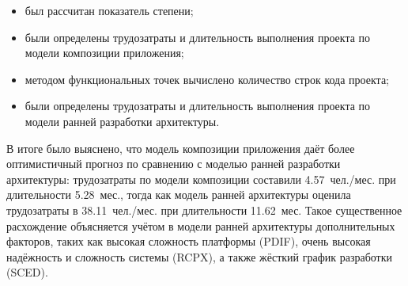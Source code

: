 \begin{itemize}
    \item был рассчитан показатель степени;
    \item были определены трудозатраты и длительность выполнения проекта по модели композиции приложения;
    \item методом функциональных точек вычислено количество строк кода проекта;
    \item были определены трудозатраты и длительность выполнения проекта по модели ранней разработки архитектуры.
\end{itemize}

В итоге было выяснено, что модель композиции приложения даёт более оптимистичный прогноз по сравнению с моделью ранней разработки архитектуры: 
трудозатраты по модели композиции составили 4.57~чел./мес. при длительности 5.28~мес., тогда как модель ранней архитектуры оценила 
трудозатраты в 38.11~чел./мес. при длительности 11.62~мес. 
Такое существенное расхождение объясняется учётом в модели ранней архитектуры дополнительных факторов, таких как высокая сложность 
платформы (PDIF), очень высокая надёжность и сложность системы (RCPX), а также жёсткий график разработки (SCED).
